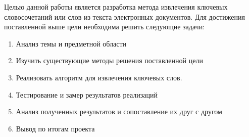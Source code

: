 Целью данной работы является разработка метода извлечения ключевых словосочетаний или слов из текста электронных документов.
Для достижения поставленной выше цели необходима решить следующие задачи:

\begin{enumerate}
	\item Анализ темы и предметной области
	\item Изучить существующие методы решения поставленной цели
	\item Реализовать алгоритм для извлечения ключевых слов.
	\item Тестирование и замер результатов реализаций
	\item Анализ полученных результатов и сопоставление их друг с другом
	\item Вывод по итогам проекта
\end{enumerate}